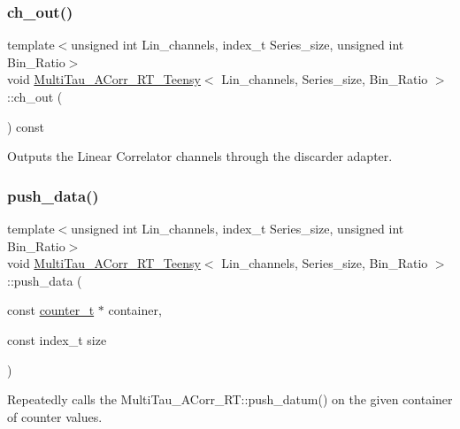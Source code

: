 \subsubsection{\texorpdfstring{ch\+\_\+out()}{ch\_out()}}
{\footnotesize\ttfamily template$<$unsigned int Lin\+\_\+channels, index\+\_\+t Series\+\_\+size, unsigned int Bin\+\_\+\+Ratio$>$ \\
void \hyperlink{classMultiTau__ACorr__RT__Teensy}{Multi\+Tau\+\_\+\+A\+Corr\+\_\+\+R\+T\+\_\+\+Teensy}$<$ Lin\+\_\+channels, Series\+\_\+size, Bin\+\_\+\+Ratio $>$\+::ch\+\_\+out (\begin{DoxyParamCaption}{ }\end{DoxyParamCaption}) const\hspace{0.3cm}{\ttfamily [inline]}}



Outputs the Linear Correlator channels through the discarder adapter. 

\mbox{\label{classMultiTau__ACorr__RT__Teensy_ae36ab4fb6f646d068e638ab7e4ec9da8}} 
\subsubsection{\texorpdfstring{push\+\_\+data()}{push\_data()}}
{\footnotesize\ttfamily template$<$unsigned int Lin\+\_\+channels, index\+\_\+t Series\+\_\+size, unsigned int Bin\+\_\+\+Ratio$>$ \\
void \hyperlink{classMultiTau__ACorr__RT__Teensy}{Multi\+Tau\+\_\+\+A\+Corr\+\_\+\+R\+T\+\_\+\+Teensy}$<$ Lin\+\_\+channels, Series\+\_\+size, Bin\+\_\+\+Ratio $>$\+::push\+\_\+data (\begin{DoxyParamCaption}\item[{const \hyperlink{types_8hpp_ac89ac912f524b3e3fa3720ea55fec966}{counter\+\_\+t} $\ast$}]{container,  }\item[{const index\+\_\+t}]{size }\end{DoxyParamCaption})\hspace{0.3cm}{\ttfamily [inline]}}



Repeatedly calls the Multi\+Tau\+\_\+\+A\+Corr\+\_\+\+R\+T\+::push\+\_\+datum() on the given container of counter values. 

